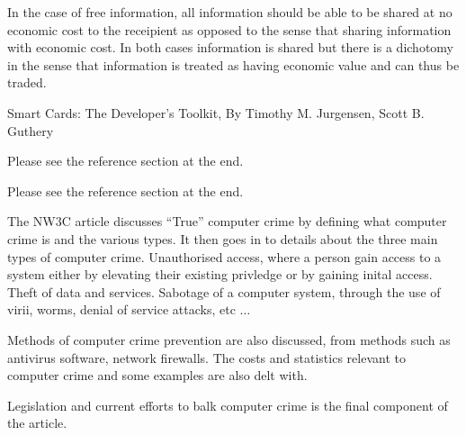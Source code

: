 

In the case of free information, all information should be able to be shared at no economic cost to the receipient as opposed to the sense that sharing information with economic cost. In both cases information is shared but there is a dichotomy in the sense that information is treated as having economic value and can thus be traded.



Smart Cards: The Developer's Toolkit, By Timothy M. Jurgensen, Scott B. Guthery




Please see the reference section at the end.\cite{sctdt}




Please see the reference section at the end.\cite{tcc}

The NW3C article discusses ``True'' computer crime by defining what computer crime is and the various types. It then goes in to details about the three main types of computer crime. Unauthorised access, where a person gain access to a system either by elevating their existing privledge or by gaining inital access. Theft of data and services. Sabotage of a computer system, through the use of virii, worms, denial of service attacks, etc $\ldots$

Methods of computer crime prevention are also discussed, from methods such as antivirus software, network firewalls. The costs and statistics relevant to computer crime and some examples are also delt with.

Legislation and current efforts to balk computer crime is the final component of the article.

